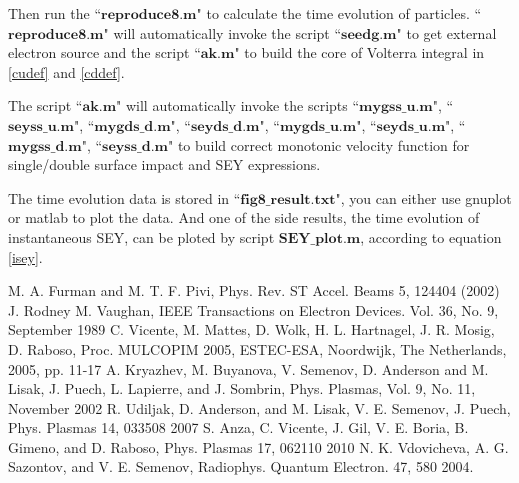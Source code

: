 \documentclass[a4paper,11pt]{article}
\begin{document}
Then run the ``$\mathbf{reproduce8.m}$" to calculate the time evolution of particles. ``$\mathbf{reproduce8.m}$" will automatically invoke the script ``$\mathbf{seedg.m}$" to get external electron source and the script ``$\mathbf{ak.m}$" to build the core of Volterra integral in \eqref{cudef} and \eqref{cddef}. 

The script ``$\mathbf{ak.m}$" will automatically invoke the scripts ``$\mathbf{mygss\_u.m}$", ``$\mathbf{seyss\_u.m}$", ``$\mathbf{ mygds\_d.m}$", ``$\mathbf{seyds\_d.m}$", ``$\mathbf{mygds\_u.m}$", ``$\mathbf{seyds\_u.m}$", ``$\mathbf{mygss\_d.m}$", ``$\mathbf{seyss\_d.m}$" to build correct monotonic velocity function for single/double surface impact and SEY expressions.

The time evolution data is stored in ``$\mathbf{fig8\_result.txt}$", you can either use gnuplot or matlab to plot the data.
And one of the side results, the time evolution of instantaneous SEY, can be ploted by script $\mathbf{SEY\_plot.m}$, according to equation \eqref{isey}. 
\begin{thebibliography}{99}
 M. A. Furman and M. T. F. Pivi,  
Phys. Rev. ST Accel. Beams 5, 124404 (2002)
 J. Rodney M. Vaughan, IEEE Transactions on Electron Devices. Vol. 36, No. 9, September 1989
 C. Vicente, M. Mattes, D. Wolk, H. L. Hartnagel, J. R. Mosig, D. Raboso, Proc. MULCOPIM 2005, ESTEC-ESA, Noordwijk, The Netherlands, 2005, pp. 11-17
 A. Kryazhev, M. Buyanova, V. Semenov, D. Anderson and M. Lisak, J. Puech, L. Lapierre, and J. Sombrin,
Phys. Plasmas, Vol. 9, No. 11, November 2002
 R. Udiljak, D. Anderson, and M. Lisak, V. E. Semenov, J. Puech, Phys. Plasmas 14, 033508 2007
 S. Anza, C. Vicente, J. Gil, V. E. Boria, B. Gimeno, and D. Raboso, Phys. Plasmas 17, 062110 2010
 N. K. Vdovicheva, A. G. Sazontov, and V. E. Semenov, Radiophys. Quantum Electron. 47, 580 2004.

\end{thebibliography} 
\end{document}
